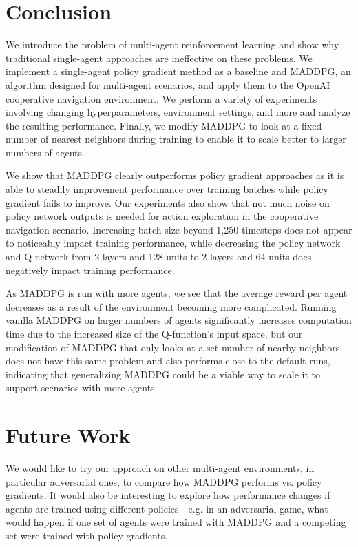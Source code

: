 \documentclass{article}
\begin{document}
\section{Conclusion}

We introduce the problem of multi-agent reinforcement learning and show why traditional single-agent approaches are ineffective on these problems. We implement a single-agent policy gradient method as a baseline and MADDPG, an algorithm designed for multi-agent scenarios, and apply them to the OpenAI cooperative navigation environment. We perform a variety of experiments involving changing hyperparameters, environment settings, and more and analyze the resulting performance. Finally, we modify MADDPG to look at a fixed number of nearest neighbors during training to enable it to scale better to larger numbers of agents.

We show that MADDPG clearly outperforms policy gradient approaches as it is able to steadily improvement performance over training batches while policy gradient fails to improve. Our experiments also show that not much noise on policy network outputs is needed for action exploration in the cooperative navigation scenario. Increasing batch size beyond 1,250 timesteps does not appear to noticeably impact training performance, while decreasing the policy network and Q-network from 2 layers and 128 units to 2 layers and 64 units does negatively impact training performance.

As MADDPG is run with more agents, we see that the average reward per agent decreases as a result of the environment becoming more complicated. Running vanilla MADDPG on larger numbers of agents significantly increases computation time due to the increased size of the Q-function's input space, but our modification of MADDPG that only looks at a set number of nearby neighbors does not have this same problem and also performs close to the default runs, indicating that generalizing MADDPG could be a viable way to scale it to support scenarios with more agents.


\section{Future Work}
We would like to try our approach on other multi-agent environments, in particular adversarial ones, to compare how MADDPG performs vs. policy gradients. It would also be interesting to explore how performance changes if agents are trained using different policies - e.g. in an adversarial game, what would happen if one set of agents were trained with MADDPG and a competing set were trained with policy gradients.
\end{document}
